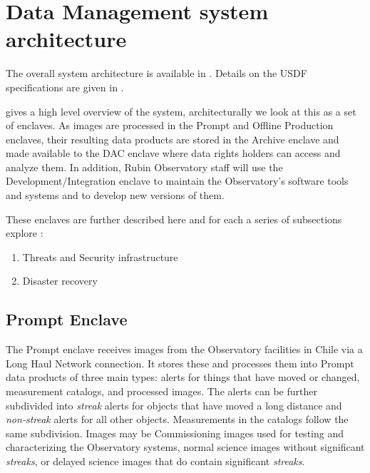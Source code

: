 

\section{Data Management system architecture} \label{sec:dparc}
The overall system architecture is available in .
Details on the \gls{USDF} specifications are given in .

 gives a high level overview of the system, architecturally we look
at this as a set of enclaves.
As images are processed in the Prompt and Offline Production enclaves, their resulting data products are stored in the \gls{Archive} enclave and made available to the DAC enclave where data rights holders can access and analyze them.
In addition, Rubin Observatory staff will use the Development/Integration enclave to maintain the Observatory's software tools and systems and to develop new versions of them.

These enclaves are further described here and for each a series of subsections explore :


\begin{enumerate}
\item Threats and Security infrastructure
\item Disaster recovery
\end{enumerate}

\subsection{Prompt \gls{Enclave}}

The Prompt enclave receives images from the Observatory facilities in Chile via a Long Haul Network connection.
It stores these and processes them into Prompt data products of three main types:
alerts for things that have moved or changed, measurement catalogs, and processed images.
The alerts can be further subdivided into \emph{streak} alerts for objects that have moved a long distance and \emph{non-streak} alerts for all other objects.
Measurements in the catalogs follow the same subdivision. Images may be \gls{Commissioning} images used for testing and characterizing the Observatory systems, normal science images without significant \emph{streaks}, or delayed science images that do contain significant \emph{streaks}.

